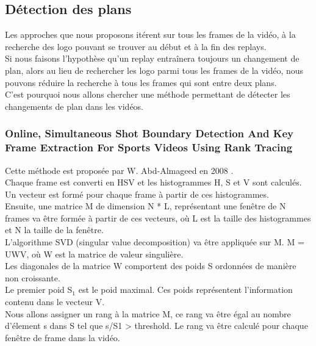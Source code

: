 \documentclass[11pt]{article}
\begin{document}
\subsection{Détection des plans}
\label{sec:org40c44e0}
Les approches que nous proposons itérent sur tous les frames de la vidéo, à la recherche des logo pouvant se trouver au début et à la fin des replays.\\
Si nous faisons l'hypothèse qu'un replay entraînera toujours un changement de plan, alors au lieu de rechercher les logo parmi tous les frames de la vidéo, nous pouvons réduire la recherche à tous les frames qui sont entre deux plans.\\

C'est pourquoi nous allons chercher une méthode permettant de détecter les changements de plan dans les vidéos.\\

\subsubsection{Online, Simultaneous Shot Boundary Detection And Key Frame Extraction For Sports Videos Using Rank Tracing}
\label{sec:org42117b0}
Cette méthode est proposée par W. Abd-Almageed en 2008 \cite{Abd_Almageed_2008}.\\

Chaque frame est converti en HSV et les histogrammes H, S et V sont calculés.\\
Un vecteur est formé pour chaque frame à partir de ces histogrammes.\\
Ensuite, une matrice M de dimension N * L, représentant une fenêtre de N frames va être formée à partir de ces vecteurs, où L est la taille des histogrammes et N la taille de la fenêtre.\\

L'algorithme SVD (singular value decomposition) va être appliquée sur M. M = UWV, où W est la matrice de valeur singulière.\\

Les diagonales de la matrice W comportent des poids S ordonnées de manière non croissante.\\
Le premier poid S\(_{\text{1}}\) est le poid maximal. Ces poids représentent l'information contenu dans le vecteur V.\\

Nous allons assigner un rang à la matrice M,  ce rang va être égal au nombre d'élement s dans S tel que s/S1 > threshold. Le rang va être calculé pour chaque fenêtre de frame dans la vidéo.\\
\end{document}
